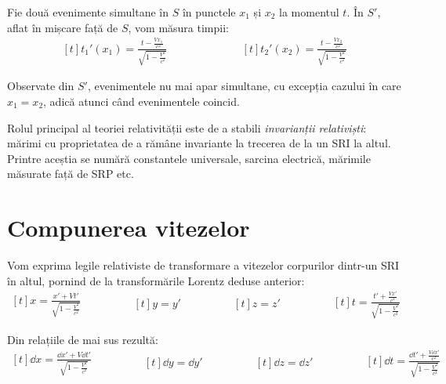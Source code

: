 \documentclass[a4paper, 12pt]{article}
\newcommand{\lorentzradical}{\sqrt{1 - \frac{V^2}{c^2}}}
\begin{document}
Fie două evenimente simultane în $S$ în punctele $x_1$ și $x_2$ la momentul
$t$. În $S'$, aflat în mișcare față de $S$, vom măsura timpii:
\begin{equation*}
    \begin{aligned}[t]
        t_1'(x_1) = \frac{t - \frac{Vx_1}{c^2}}{\lorentzradical}
    \end{aligned}
    \qquad\qquad\qquad
    \begin{aligned}[t]
        t_2'(x_2) = \frac{t - \frac{Vx_2}{c^2}}{\lorentzradical}
    \end{aligned}
\end{equation*}

Observate din $S'$, evenimentele nu mai apar simultane, cu excepția cazului în
care \( x_1 = x_2 \), adică atunci când evenimentele coincid.

Rolul principal al teoriei relativității este de a stabili
\emph{invarianții relativiști}: mărimi cu proprietatea de a rămâne invariante
la trecerea de la un SRI la altul. Printre aceștia se numără constantele
universale, sarcina electrică, mărimile măsurate față de SRP etc.

\section{Compunerea vitezelor}

Vom exprima legile relativiste de transformare a vitezelor corpurilor dintr-un
SRI în altul, pornind de la transformările Lorentz deduse anterior:
\begin{equation*}
    \begin{aligned}[t]
        x = \frac{x' + Vt'}{\lorentzradical}
    \end{aligned}\qquad\qquad
    \begin{aligned}[t]
        y = y'
    \end{aligned}\qquad\qquad
    \begin{aligned}[t]
        z = z'
    \end{aligned}\qquad\qquad
    \begin{aligned}[t]
        t = \frac{t' + \frac{Vx'}{c^2}}{\lorentzradical}
    \end{aligned}
\end{equation*}

Din relațiile de mai sus rezultă:
\begin{equation*}
    \begin{aligned}[t]
        \dd x = \frac{\dd x' + V\dd t'}{\lorentzradical}
    \end{aligned}\qquad\qquad
    \begin{aligned}[t]
        \dd y = \dd y'
    \end{aligned}\qquad\qquad
    \begin{aligned}[t]
        \dd z = \dd z'
    \end{aligned}\qquad\qquad
    \begin{aligned}[t]
        \dd t = \frac{\dd t' + \frac{V\dd x'}{c^2}}{\lorentzradical}
    \end{aligned}
\end{equation*}
\end{document}
